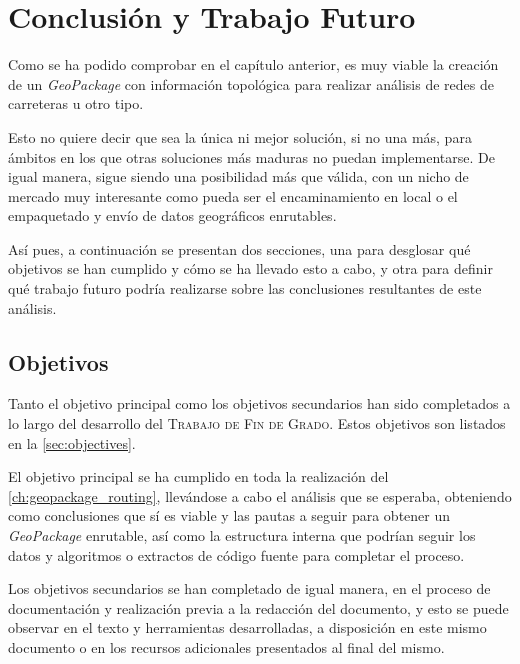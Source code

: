 \chapter{Conclusión y Trabajo Futuro}
\label{ch:conclusion}

Como se ha podido comprobar en el capítulo anterior, es muy viable la creación de un \textit{GeoPackage} con información topológica para realizar análisis de redes de carreteras u otro tipo. 

Esto no quiere decir que sea la única ni mejor solución, si no una más, para ámbitos en los que otras soluciones más maduras no puedan implementarse.
De igual manera, sigue siendo una posibilidad más que válida, con un nicho de mercado muy interesante como pueda ser el encaminamiento en local o el empaquetado y envío de datos geográficos enrutables.

Así pues, a continuación se presentan dos secciones, una para desglosar qué objetivos se han cumplido y cómo se ha llevado esto a cabo, y otra para definir qué trabajo futuro podría realizarse sobre las conclusiones resultantes de este análisis.

\section{Objetivos}

Tanto el objetivo principal como los objetivos secundarios han sido completados a lo largo del desarrollo del \textsc{Trabajo de Fin de Grado}. Estos objetivos son listados en la \autoref{sec:objectives}.

El objetivo principal se ha cumplido en toda la realización del \autoref{ch:geopackage_routing}, llevándose a cabo el análisis que se esperaba, obteniendo como conclusiones que sí es viable y las pautas a seguir para obtener un \textit{GeoPackage} enrutable, así como la estructura interna que podrían seguir los datos y algoritmos o extractos de código fuente para completar el proceso.

Los objetivos secundarios se han completado de igual manera, en el proceso de documentación y realización previa a la redacción del documento, y esto se puede observar en el texto y herramientas desarrolladas, a disposición en este mismo documento o en los recursos adicionales presentados al final del mismo.


